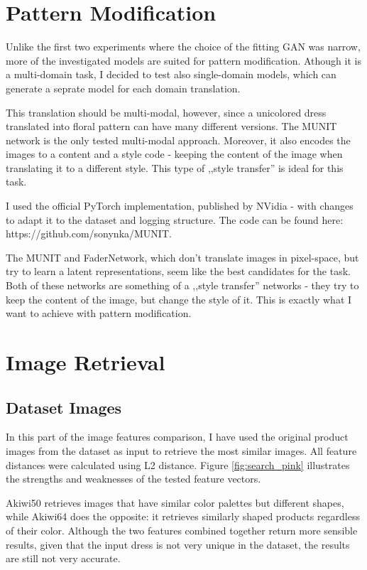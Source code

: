 \documentclass[12pt]{report}
\begin{document}
\section{Pattern Modification}
Unlike the first two experiments where the choice of the fitting GAN was narrow, more of the investigated models are suited for pattern modification. Athough it is a multi-domain task, I decided to test also single-domain models, which can generate a seprate model for each domain translation.

This translation should be multi-modal, however, since a unicolored dress translated into floral pattern can have many different versions. The MUNIT network is the only tested multi-modal approach. Moreover, it also encodes the images to a content and a style code - keeping the content of the image when translating it to a different style. This type of ,,style transfer'' is ideal for this task.

I used the official PyTorch implementation, published by NVidia - with changes to adapt it to the dataset and logging structure. The code can be found here: https://github.com/sonynka/MUNIT.

The MUNIT and FaderNetwork, which don't translate images in pixel-space, but try to learn a latent representations, seem like the best candidates for the task. Both of these networks are something of a ,,style transfer'' networks - they try to keep the content of the image, but change the style of it. This is exactly what I want to achieve with pattern modification.




\pagebreak
\section{Image Retrieval}

\subsection{Dataset Images}
In this part of the image features comparison, I have used the original product images from the dataset as input to retrieve the most similar images. All feature distances were calculated using L2 distance. Figure \ref{fig:search_pink} illustrates the strengths and weaknesses of the tested feature vectors. 

Akiwi50 retrieves images that have similar color palettes but different shapes, while Akiwi64 does the opposite: it retrieves similarly shaped products regardless of their color. Although the two features combined together return more sensible results, given that the input dress is not very unique in the dataset, the results are still not very accurate. 
\end{document}
